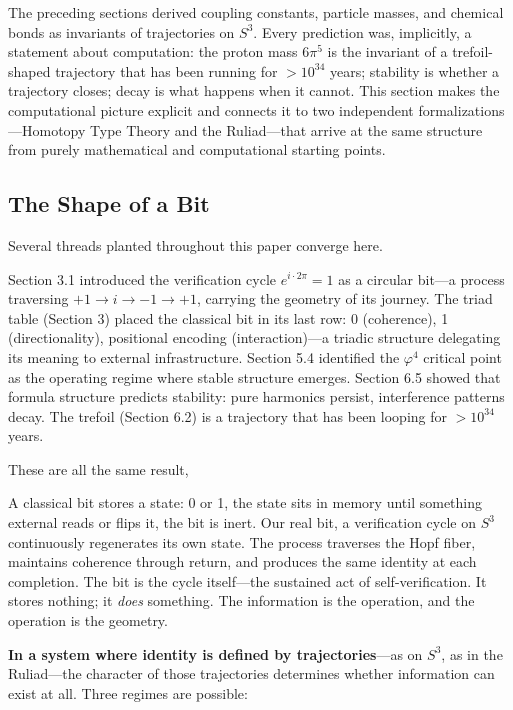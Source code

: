 \documentclass[12pt]{article}
\begin{document}
The preceding sections derived coupling constants, particle masses, and chemical bonds as invariants of trajectories on $S^3$. Every prediction was, implicitly, a statement about computation: the proton mass $6\pi^5$ is the invariant of a trefoil-shaped trajectory that has been running for $>10^{34}$ years; stability is whether a trajectory closes; decay is what happens when it cannot. This section makes the computational picture explicit and connects it to two independent formalizations---Homotopy Type Theory and the Ruliad---that arrive at the same structure from purely mathematical and computational starting points.

\subsection{The Shape of a Bit}

Several threads planted throughout this paper converge here.

Section 3.1 introduced the verification cycle $e^{i \cdot 2\pi} = 1$ as a circular bit---a process traversing $+1 \to i \to -1 \to +1$, carrying the geometry of its journey. The triad table (Section 3) placed the classical bit in its last row: 0 (coherence), 1 (directionality), positional encoding (interaction)---a triadic structure delegating its meaning to external infrastructure. Section 5.4 identified the $\varphi^4$ critical point as the operating regime where stable structure emerges. Section 6.5 showed that formula structure predicts stability: pure harmonics persist, interference patterns decay. The trefoil (Section 6.2) is a trajectory that has been looping for $>10^{34}$ years.

These are all the same result,

A classical bit stores a state: 0 or 1, the state sits in memory until something external reads or flips it, the bit is inert. Our real bit, a verification cycle on $S^3$ continuously regenerates its own state. The process traverses the Hopf fiber, maintains coherence through return, and produces the same identity at each completion. The bit is the cycle itself---the sustained act of self-verification. It stores nothing; it \textit{does} something. The information is the operation, and the operation is the geometry.

\textbf{In a system where identity is defined by trajectories}---as on $S^3$, as in the Ruliad---the character of those trajectories determines whether information can exist at all. Three regimes are possible:
\end{document}
